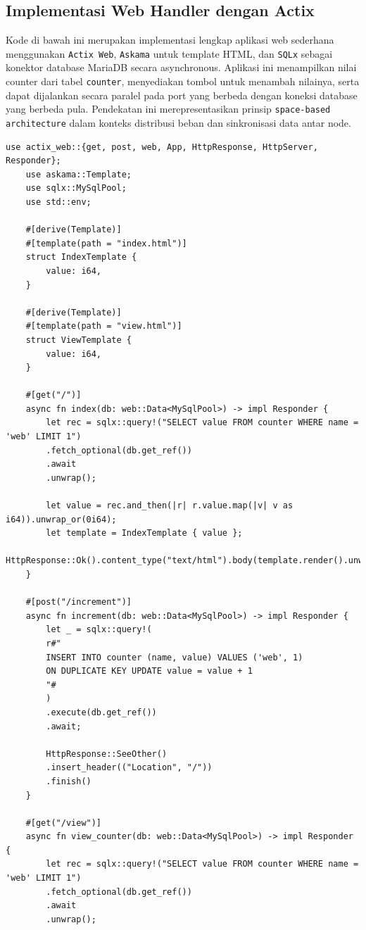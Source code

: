 \subsection{Implementasi Web Handler dengan Actix}

Kode di bawah ini merupakan implementasi lengkap aplikasi web sederhana menggunakan \texttt{Actix Web}, \texttt{Askama} untuk template HTML, dan \texttt{SQLx} sebagai konektor database MariaDB secara asynchronous. Aplikasi ini menampilkan nilai counter dari tabel \texttt{counter}, menyediakan tombol untuk menambah nilainya, serta dapat dijalankan secara paralel pada port yang berbeda dengan koneksi database yang berbeda pula. Pendekatan ini merepresentasikan prinsip \texttt{space-based architecture} dalam konteks distribusi beban dan sinkronisasi data antar node.

\begin{lstlisting}[style=RustStyle, caption={Implementasi server Actix Web dengan SQLx dan Askama}]
	use actix_web::{get, post, web, App, HttpResponse, HttpServer, Responder};
	use askama::Template;
	use sqlx::MySqlPool;
	use std::env;
	
	#[derive(Template)]
	#[template(path = "index.html")]
	struct IndexTemplate {
		value: i64,
	}
	
	#[derive(Template)]
	#[template(path = "view.html")]
	struct ViewTemplate {
		value: i64,
	}
	
	#[get("/")]
	async fn index(db: web::Data<MySqlPool>) -> impl Responder {
		let rec = sqlx::query!("SELECT value FROM counter WHERE name = 'web' LIMIT 1")
		.fetch_optional(db.get_ref())
		.await
		.unwrap();
		
		let value = rec.and_then(|r| r.value.map(|v| v as i64)).unwrap_or(0i64);
		let template = IndexTemplate { value };
		HttpResponse::Ok().content_type("text/html").body(template.render().unwrap())
	}
	
	#[post("/increment")]
	async fn increment(db: web::Data<MySqlPool>) -> impl Responder {
		let _ = sqlx::query!(
		r#"
		INSERT INTO counter (name, value) VALUES ('web', 1)
		ON DUPLICATE KEY UPDATE value = value + 1
		"#
		)
		.execute(db.get_ref())
		.await;
		
		HttpResponse::SeeOther()
		.insert_header(("Location", "/"))
		.finish()
	}
	
	#[get("/view")]
	async fn view_counter(db: web::Data<MySqlPool>) -> impl Responder {
		let rec = sqlx::query!("SELECT value FROM counter WHERE name = 'web' LIMIT 1")
		.fetch_optional(db.get_ref())
		.await
		.unwrap();
		

\end{lstlisting}
